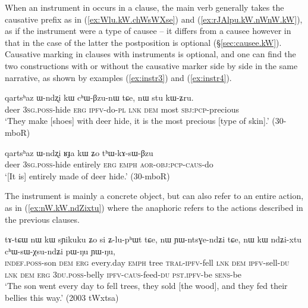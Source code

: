 When an instrument in  occurs in a clause, the main verb generally takes the causative prefix as in (\ref{ex:Wlu.kW.chWsWXse}) and (\ref{ex:rJAlpu.kW.nWnW.kW}), as if the instrument were a type of causee -- it differs from a causee however in that in the case of the latter the postposition  is optional (§\ref{sec:causee.kW}). Causative marking in clauses with  instruments is optional, and one can find the two constructions with or without the causative marker side by side in the same narrative, as shown by examples (\ref{ex:instr3}) and (\ref{ex:instr4}).

\begin{exe} 
\ex \label{ex:instr3}
\gll   qartsʰaz  ɯ-ndʐi kɯ cʰɯ-βzu-nɯ tɕe, nɯ stu kɯ-ʑru.   \\
 deer \textsc{3sg}.\textsc{poss}-hide \textsc{erg} \textsc{ipfv}-do-\textsc{pl} \textsc{lnk} \textsc{dem} most \textsc{sbj}:\textsc{pcp}-precious \\
 \glt   `They make [shoes] with deer hide, it is the most precious [type of skin].' (30-mboR)
\end{exe} 

 \begin{exe} 
\ex \label{ex:instr4}
\gll   qartsʰaz ɯ-ndʐi ʁɟa kɯ ʑo tʰɯ-kɤ-sɯ-βzu  \\
 deer \textsc{3sg}.\textsc{poss}-hide entirely \textsc{erg} \textsc{emph} \textsc{aor}-\textsc{obj}:\textsc{pcp}-\textsc{caus}-do\\
 \glt   `[It is] entirely made of deer hide.' (30-mboR)
\end{exe} 

The instrument is mainly a concrete object, but can also refer to an entire action, as in (\ref{ex:nW.kW.ndZixtu}) where the anaphoric  refers to the actions described in the previous clauses.

\begin{exe}
\ex \label{ex:nW.kW.ndZixtu}
 \gll tɤ-tɕɯ nɯ kɯ sɲikuku ʑo si ʑ-lu-pʰɯt tɕe, nɯ ɲɯ-ntsɣe-ndʑi tɕe,  nɯ kɯ ndʑi-xtu cʰɯ-sɯ-χsu-ndʑi pɯ-ŋu ɲɯ-ŋu,  \\
 \textsc{indef}.\textsc{poss}-son \textsc{dem} \textsc{erg} every.day \textsc{emph} tree \textsc{tral}-\textsc{ipfv}-fell \textsc{lnk} \textsc{dem} \textsc{ipfv}-sell-\textsc{du} \textsc{lnk} \textsc{dem} \textsc{erg} \textsc{3du}.\textsc{poss}-belly \textsc{ipfv}-\textsc{caus}-feed-\textsc{du} \textsc{pst}.\textsc{ipfv}-be \textsc{sens}-be \\
 \glt `The son went every day to fell trees, they sold [the wood], and they fed their bellies this way.' (2003 tWxtsa)
\end{exe}

